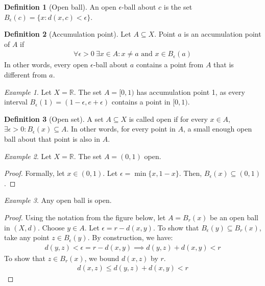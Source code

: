 \documentclass[11pt]{article}
\newcommand{\R}{\ensuremath{\mathbb R}}
\newcommand{\e}{\epsilon}
\newcommand{\E}{\exists}
\newcommand{\sse}{\subseteq}
\theoremstyle{plain}
\theoremstyle{definition}
\newtheorem{defi}{Definition}[section]
\theoremstyle{remark}
\newtheorem{exm}{Example}[section]
\begin{document}
\begin{defi}[Open ball]
    An open $\e$-ball about $c$ is the set $B_{\e}(c) = \{x : d(x,c) < \e\}$.
\end{defi}
\begin{defi}[Accumulation point]
    Let $A \sse X$. Point $a$ is an accumulation point of $A$ if 
    \begin{align*}
        \forall \e > 0 \ \E x \in A: x \neq a \text{ and } x \in B_{\e}(a)
    \end{align*}
    In other words, every open $\e$-ball about $a$ contains a point from $A$ that is different from $a$.
\end{defi}
\begin{exm}
    Let $X = \R$. The set $A = [0, 1)$ has accumulation point 1, as every interval $B_{\e}(1) = (1 - \e, e + \e)$ contains a point in $[0,1)$.
\end{exm}
\begin{defi}[Open set]
    A set $A \sse X$ is called open if for every $x \in A$, $\E \e>0 : B_{\e}(x) \sse A$. In other words, for every point in $A$, a small enough open ball about that point is also in $A$.
\end{defi}
\begin{exm}
    Let $X = \R$. The set $A = (0, 1)$ open.
    \begin{proof}
    Formally, let $x \in (0,1)$. Let $\e = \min\{x, 1-x\}$. Then, $B_{\e}(x) \sse (0,1)$.
    \end{proof}
\end{exm}
\begin{exm}
    Any open ball is open.
    \begin{proof}
    Using the notation from the figure below, let $A = B_r(x)$ be an open ball in $(X,d)$. Choose $y \in A$. Let $\e = r - d(x,y)$. To show that $B_{\e}(y) \sse B_r(x)$, take any point $z \in B_{\e}(y)$. By construction, we have:
    \begin{align*}
        d(y, z) < \e = r - d(x,y) \implies d(y, z) + d(x, y) < r
    \end{align*}
    To show that $z \in B_r(x)$, we bound $d(x,z)$ by $r$.
    \begin{align*}
        d(x,z) \leq d(y, z) + d(x, y) < r
    \end{align*}
    \end{proof}
\end{exm}
\clearpage
\end{document}
